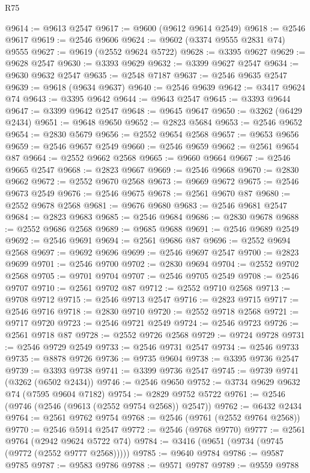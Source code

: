 \begin{lexlean}{R75}
\begin{coremodule}
@9614 := @9613 @2547
@9617 := @9600 (@9612 @9614 @2549)
@9618 := @2546 @9617
@9619 := @2546 @9606
@9624 := @9602 (@3374 @9555 @2831 @74) @9555
@9627 := @9619 (@2552 @9624 @5722)
@9628 := @3395 @9627
@9629 := @9628 @2547
@9630 := @3393 @9629
@9632 := @3399 @9627 @2547
@9634 := @9630 @9632 @2547
@9635 := @2548 @7187
@9637 := @2546 @9635 @2547
@9639 := @9618 (@9634 @9637)
@9640 := @2546 @9639
@9642 := @3417 @9624 @74
@9643 := @3395 @9642
@9644 := @9643 @2547
@9645 := @3393 @9644
@9647 := @3399 @9642 @2547
@9648 := @9645 @9647
@9650 := @3262 (@6429 @2434)
@9651 := @9648 @9650
@9652 := @2823 @5684
@9653 := @2546 @9652
@9654 := @2830 @5679
@9656 := @2552 @9654 @2568
@9657 := @9653 @9656
@9659 := @2546 @9657 @2549
@9660 := @2546 @9659
@9662 := @2561 @9654 @87
@9664 := @2552 @9662 @2568
@9665 := @9660 @9664
@9667 := @2546 @9665 @2547
@9668 := @2823 @9667
@9669 := @2546 @9668
@9670 := @2830 @9662
@9672 := @2552 @9670 @2568
@9673 := @9669 @9672
@9675 := @2546 @9673 @2549
@9676 := @2546 @9675
@9678 := @2561 @9670 @87
@9680 := @2552 @9678 @2568
@9681 := @9676 @9680
@9683 := @2546 @9681 @2547
@9684 := @2823 @9683
@9685 := @2546 @9684
@9686 := @2830 @9678
@9688 := @2552 @9686 @2568
@9689 := @9685 @9688
@9691 := @2546 @9689 @2549
@9692 := @2546 @9691
@9694 := @2561 @9686 @87
@9696 := @2552 @9694 @2568
@9697 := @9692 @9696
@9699 := @2546 @9697 @2547
@9700 := @2823 @9699
@9701 := @2546 @9700
@9702 := @2830 @9694
@9704 := @2552 @9702 @2568
@9705 := @9701 @9704
@9707 := @2546 @9705 @2549
@9708 := @2546 @9707
@9710 := @2561 @9702 @87
@9712 := @2552 @9710 @2568
@9713 := @9708 @9712
@9715 := @2546 @9713 @2547
@9716 := @2823 @9715
@9717 := @2546 @9716
@9718 := @2830 @9710
@9720 := @2552 @9718 @2568
@9721 := @9717 @9720
@9723 := @2546 @9721 @2549
@9724 := @2546 @9723
@9726 := @2561 @9718 @87
@9728 := @2552 @9726 @2568
@9729 := @9724 @9728
@9731 := @2546 @9729 @2549
@9733 := @2546 @9731 @2547
@9734 := @2546 @9733
@9735 := @8878 @9726
@9736 := @9735 @9604
@9738 := @3395 @9736 @2547
@9739 := @3393 @9738
@9741 := @3399 @9736 @2547
@9745 := @9739 @9741 (@3262 (@6502 @2434))
@9746 := @2546 @9650
@9752 := @3734 @9629 @9632 @74 (@7595 @9604 @7182)
@9754 := @2829 @9752 @5722
@9761 := @2546 (@9746 (@2546 (@9613 (@2552 @9754 @2568)) @2547))
@9762 := @6432 @2434
@9764 := @2561 @9762 @9754
@9768 := @2546 (@9761 (@2552 @9764 @2568))
@9770 := @2546 @5914 @2547
@9772 := @2546 (@9768 @9770)
@9777 := @2561 @9764 (@2942 @9624 @5722 @74)
@9784 := @3416 (@9651 (@9734 (@9745 (@9772 (@2552 @9777 @2568)))))
@9785 := @9640 @9784
@9786 := @9587 @9785
@9787 := @9583 @9786
@9788 := @9571 @9787
@9789 := @9559 @9788

\end{coremodule}
\end{lexlean}
